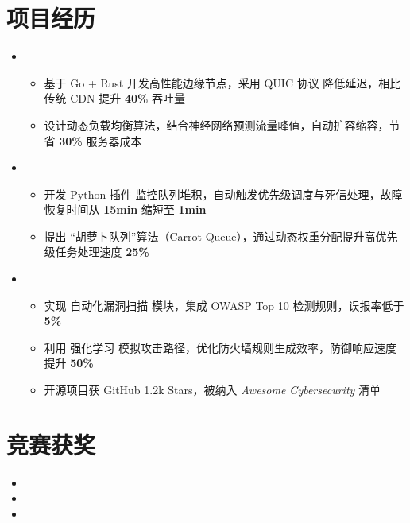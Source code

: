 \documentclass{resume}
\begin{document}
\section{项目经历}
\begin{itemize}
  \item {}
  \ \begin{itemize}
      \item 基于 Go + Rust 开发高性能边缘节点，采用 QUIC 协议 降低延迟，相比传统 CDN 提升 \textbf{40\%} 吞吐量
      \item 设计动态负载均衡算法，结合神经网络预测流量峰值，自动扩容缩容，节省 \textbf{30\%} 服务器成本
  \ \end{itemize}

  \item {}
  \ \begin{itemize}
      \item 开发 Python 插件 监控队列堆积，自动触发优先级调度与死信处理，故障恢复时间从 \textbf{15min} 缩短至 \textbf{1min}
      \item 提出 “胡萝卜队列”算法（Carrot-Queue），通过动态权重分配提升高优先级任务处理速度 \textbf{25\%}
  \ \end{itemize}

  \item {}
  \ \begin{itemize}
      \item 实现 自动化漏洞扫描 模块，集成 OWASP Top 10 检测规则，误报率低于 \textbf{5\%}
      \item 利用 强化学习 模拟攻击路径，优化防火墙规则生成效率，防御响应速度提升 \textbf{50\%}
      \item 开源项目获 GitHub 1.2k Stars，被纳入 \textit{Awesome Cybersecurity} 清单
  \ \end{itemize}
\end{itemize}

  \section{竞赛获奖}
\begin{itemize}[parsep=0.2ex]
\item {} 
\item {}
\item {}
\end{itemize}
\end{document}
